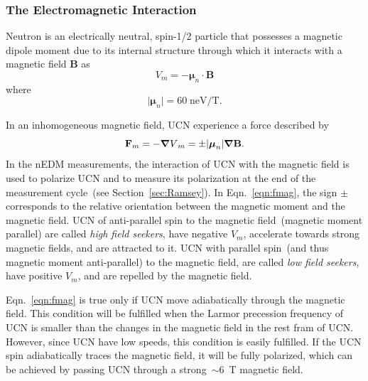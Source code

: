 \subsubsection{The Electromagnetic Interaction}

Neutron is an electrically neutral, spin-1/2 particle that possesses a
magnetic dipole moment due to its internal structure through which it
interacts with a magnetic field \textbf{B} as
\begin{equation}
  \label{eqn:vmag}
V_m=-\boldsymbol{\mu}_n \cdot \textbf{B}
\end{equation}
where
\begin{equation}
\vert \boldsymbol{\mu}_n \vert =60 \; \text{neV/T}.
\end{equation}

In an inhomogeneous magnetic field, UCN experience a force described
by
\begin{equation}
  \label{eqn:fmag}
  {\bf{F}}_m = - {\boldsymbol{\nabla}V}_m = \pm \vert {\boldsymbol{\mu}}_n \vert \boldsymbol{\nabla} \bf{B}.
\end{equation}
In the nEDM measurements, the interaction of UCN with the magnetic
field is used to polarize UCN and to measure its polarization at the
end of the measurement cycle~(see Section~\ref{sec:Ramsey}).  In
Eqn.~\ref{eqn:fmag}, the sign $\pm$ corresponds to the relative
orientation between the magnetic moment and the magnetic field.  UCN
of anti-parallel spin to the magnetic field~(magnetic moment parallel)
are called {\it{high field seekers}}, have negative $V_m$, accelerate
towards strong magnetic fields, and are attracted to it. UCN with
parallel spin~(and thus magnetic moment anti-parallel) to the magnetic
field, are called {\it{low field seekers}}, have positive $V_m$, and
are repelled by the magnetic field.

Eqn.~\ref{eqn:fmag} is true only if UCN move adiabatically through the
magnetic field. This condition will be fulfilled when the Larmor
precession frequency of UCN is smaller than the changes in the
magnetic field in the rest fram of UCN. However, since UCN have low
speeds, this condition is easily fulfilled.  If the UCN spin
adiabatically traces the magnetic field, it will be fully polarized,
which can be achieved by passing UCN through a strong~$\sim 6$~T
magnetic field.


